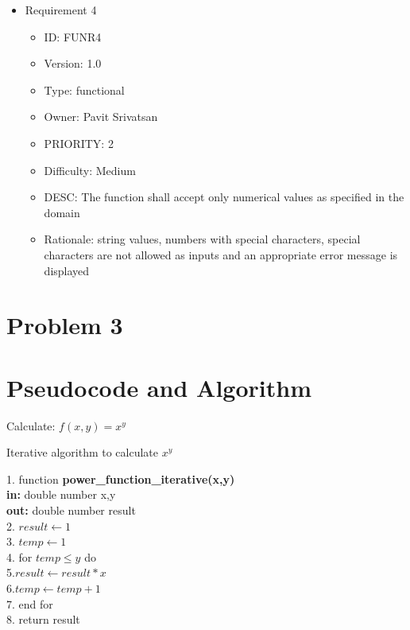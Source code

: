 \documentclass{article}
\begin{document}
\begin{itemize}
\begin{itemize}
\end{itemize}
\item Requirement 4
\begin{itemize}
\item ID:       FUNR4
\item Version:  1.0
\item Type:     functional
\item Owner:    Pavit Srivatsan
\item PRIORITY: 2
\item Difficulty: Medium
\item DESC: The function shall accept only numerical values as specified in the domain
\item Rationale: string values, numbers with special characters, special characters are not allowed as inputs and an appropriate error message is displayed
\end{itemize}
\end{itemize}

\section*{Problem 3}
\section*{Pseudocode and Algorithm}
Calculate: $f(x,y) = x^y$

\begin{algorithm}
\caption{Iterative algorithm to calculate $x^y$}
\begin{algorithmic} 
1. function \textbf{power\_function\_iterative(x,y)}\\
\textbf{in: } double number x,y\\
\textbf{out: } double number result\\
2. \STATE $result \leftarrow 1$\\
3. \STATE $temp \leftarrow 1$\\
4. for {$temp \leq y$} do\\
5.\qquad \STATE $result \leftarrow result*x$\\
6.\qquad\STATE $temp \leftarrow temp+1$\\
7. end for \\
8. \STATE return result\\
\end{algorithmic}
\end{algorithm}
\end{document}
